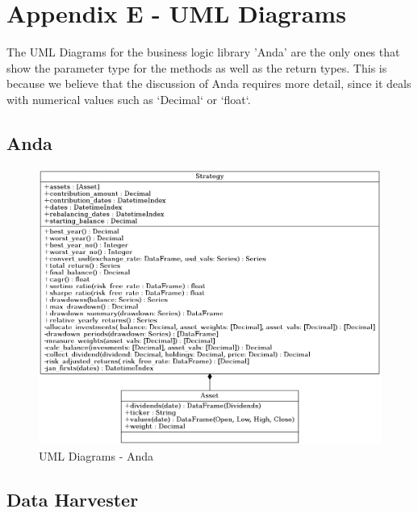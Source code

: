 \documentclass[main.tex]{subfiles}
\begin{document}
\section{Appendix E - UML Diagrams}
\label{umls}

The UML Diagrams for the business logic library 'Anda' are the only ones that show the parameter type for the methods as well as the return types.
This is because we believe that the discussion of Anda requires more detail, since it deals with numerical values such as `Decimal` or `float`.

\subsection{Anda}

\begin{figure}[H]
   \centering
   \includegraphics[width=\textwidth,keepaspectratio]{Report/08Appendices/084UML/084Pictures/classes_analyse_data.png}
   \caption{UML Diagrams - Anda}
\end{figure}

\subsection{Data Harvester}
\end{document}
